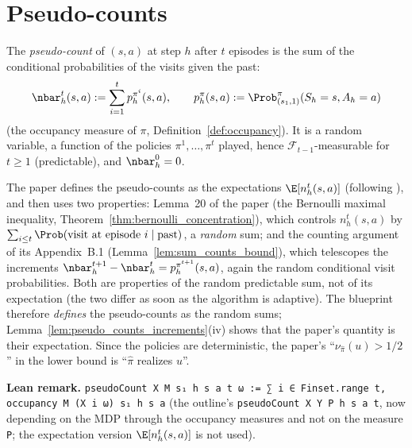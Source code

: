 \section{Pseudo-counts}
\label{sec:empirical_pseudo}

\begin{definition}\label{def:pseudo_counts}
\leanok
{}
The \emph{pseudo-count} of $(s, a)$ at step $h$ after $t$ episodes is the sum of the conditional
probabilities of the visits given the past:
\[
  \nbar_h^t(s, a) := \sum_{i = 1}^{t} p^{\pi^i}_h(s, a),
  \qquad
  p^\pi_h(s, a) := \Prob^\pi_{(s_1, 1)}(S_h = s, A_h = a)
\]
(the occupancy measure of $\pi$, Definition~\ref{def:occupancy}). It is a random variable, a
function of the policies $\pi^1, \dots, \pi^t$ played, hence $\mathcal F_{t-1}$-measurable for
$t \ge 1$ (predictable), and $\nbar_h^0 = 0$.
\end{definition}

\begin{remark}\label{rem:empirical_pseudo_counts}
The paper defines the pseudo-counts as the expectations $\E[n_h^t(s, a)]$ (following
\cite{menard2021fast}), and then uses two properties: Lemma~20 of the paper (the Bernoulli
maximal inequality, Theorem~\ref{thm:bernoulli_concentration}), which controls
$n_h^t(s, a)$ by $\sum_{i \le t} \Prob(\text{visit at episode } i \mid \text{past})$, a
\emph{random} sum; and the counting argument of its Appendix~B.1 (Lemma~\ref{lem:sum_counts_bound}),
which telescopes the increments $\nbar_h^{t+1} - \nbar_h^t = p^{\pi^{t+1}}_h(s, a)$, again the random
conditional visit probabilities. Both are properties of the random predictable sum, not of its
expectation (the two differ as soon as the algorithm is adaptive). The blueprint therefore
\emph{defines} the pseudo-counts as the random sums; Lemma~\ref{lem:pseudo_counts_increments}(iv)
shows that the paper's quantity is their expectation. Since the policies are deterministic,
the paper's ``$\nu_{\hat\pi}(u) > 1/2$'' in the lower bound is ``$\hat\pi$ realizes $u$''.
\end{remark}

\textbf{Lean remark.} \texttt{pseudoCount X M s₁ h s a t ω := ∑ i ∈ Finset.range t, occupancy M (X i ω) s₁ h s a}
(the outline's \texttt{pseudoCount X Y P h s a t}, now depending on the MDP through the
occupancy measures and not on the measure \texttt{P}; the expectation version
$\E[n_h^t(s, a)]$ is not used).

